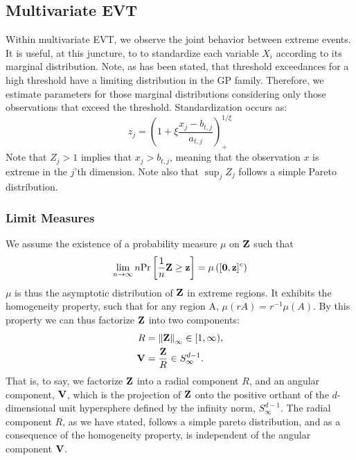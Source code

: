 \subsection{Multivariate EVT}

Within multivariate EVT, we observe the joint behavior between extreme events. It is useful, at
  this juncture, to to standardize each variable $X_i$ according to its marginal distribution.
  Note, as has been stated, that threshold exceedances for a high threshold have a limiting
  distribution in the GP family.  Therefore, we estimate parameters for those marginal distributions
  considering only those observations that exceed the threshold.
  Standardization occurs as:
  \begin{equation}
    z_j = \left(1 + \xi\frac{x_j - b_{t,j}}{a_{t,j}}\right)_{+}^{1/\xi}
  \end{equation}
  Note that $Z_j > 1$ implies that $x_j > b_{t,j}$, meaning that the observation
  $x$ is extreme in the $j$'th dimension.  Note also that $\sup_j Z_j$ follows a
  simple Pareto distribution.

\subsubsection{Limit Measures}
We assume the existence of a probability measure $\mu$ on ${\bf Z}$ such that
  \begin{equation}
    \lim_{n\rightarrow\infty}n\text{Pr}\left[\frac{1}{n}{\bf Z} \geq {\bf z}\right] = \mu\left([{\bf 0}, {\bf z}]^c\right)
    \label{eq:standard}
  \end{equation}
  $\mu$ is thus the asymptotic distribution of ${\bf Z}$ in extreme regions.  It
  exhibits the homogeneity property, such that for any region A,
  $\mu(rA) = r^{-1}\mu(A)$.  By this property we can thus factorize ${\bf Z}$
  into two components:
  \begin{equation}
    \begin{aligned}
      R &= \left\lVert {\bf Z} \right\rVert_{\infty} \in [1, \infty),\\
      {\bf V} &= \frac{{\bf Z}}{R} \in S_{\infty}^{d-1}.
    \end{aligned}
  \end{equation}
  That is, to say, we factorize ${\bf Z}$ into a radial component $R$, and an
  angular component, ${\bf V}$, which is the projection of ${\bf Z}$ onto the
  positive orthant of the $d$-dimensional unit hypersphere defined by the
  infinity norm, $S_{\infty}^{d-1}$. The radial component $R$, as we have
  stated, follows a simple pareto distribution, and as a consequence of the
  homogeneity property, is independent of the angular component ${\bf V}$.

